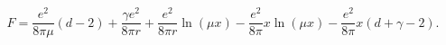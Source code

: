 \begin{equation}
F=\frac{e^{2}}{8\pi\mu}(d-2)+\frac{\gamma e^{2}}{8\pi r}+\frac{e^{2}}{8\pi
r}\ln(\mu x)-\frac{e^{2}}{8\pi}x\ln(\mu x)-\frac{e^{2}}{8\pi}x(d+\gamma-2).
\end{equation}

